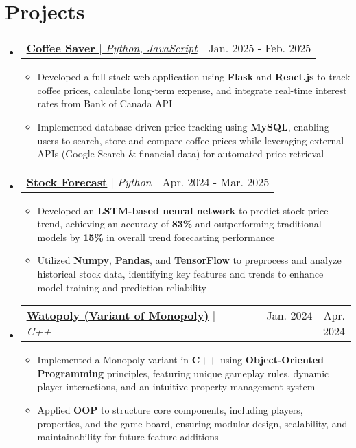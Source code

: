 \documentclass[letterpaper,11pt]{article}
\makeatletter
\newcommand{\resumeItem}[1]{
  \item\small{
    {#1 \vspace{-2pt}}
  }
}
\newcommand{\resumeProjectHeading}[2]{
    \item
    \begin{tabular*}{0.97\textwidth}{l@{\extracolsep{\fill}}r}
      \small#1 & #2 \\
    \end{tabular*}\vspace{-7pt}
}
\newcommand{\resumeSubHeadingListStart}{\begin{itemize}[leftmargin=0.15in, label={}]}
\newcommand{\resumeSubHeadingListEnd}{\end{itemize}}
\newcommand{\resumeItemListStart}{\begin{itemize}}
\newcommand{\resumeItemListEnd}{\end{itemize}\vspace{-5pt}}
\makeatother
\begin{document}
\section{Projects}
  \resumeSubHeadingListStart
    \resumeProjectHeading
      {\href{https://github.com/ThomasLiuuu/Projects/tree/main/Save\%20Money}{\underline{\textbf{Coffee Saver}} $|$ \emph{Python, JavaScript}}}{Jan. 2025 - Feb. 2025}
      \resumeItemListStart
        \resumeItem{Developed a full-stack web application using \textbf{Flask} and \textbf{React.js} to track coffee prices, calculate long-term expense, and integrate real-time interest rates from Bank of Canada API}
        \resumeItem{Implemented database-driven price tracking using \textbf{MySQL}, enabling users to search, store and compare coffee prices while leveraging external APIs (Google Search \& financial data) for automated price retrieval}
      \resumeItemListEnd

    \resumeProjectHeading
      {\href{https://github.com/ThomasLiuuu/Projects/tree/main/Stock\%20Forcast}{\underline{\textbf{Stock Forecast}}} $|$ \emph{Python}}{Apr. 2024 - Mar. 2025}
      \resumeItemListStart
        \resumeItem{Developed an \textbf{LSTM-based neural network} to predict stock price trend, achieving an accuracy of \textbf{83\%} and outperforming traditional models by \textbf{15\%} in overall trend forecasting performance}
        \resumeItem{Utilized \textbf{Numpy}, \textbf{Pandas}, and \textbf{TensorFlow} to preprocess and analyze historical stock data, identifying key features and trends to enhance model training and prediction reliability}
      \resumeItemListEnd

    \resumeProjectHeading
      {\href{https://github.com/ThomasLiuuu/Projects/tree/main/Watopoly}{\underline{\textbf{Watopoly (Variant of Monopoly)}}} $|$ \emph{C++}}{Jan. 2024 - Apr. 2024}
      \resumeItemListStart
        \resumeItem{Implemented a Monopoly variant in \textbf{C++} using \textbf{Object-Oriented Programming} principles, featuring unique gameplay rules, dynamic player interactions, and an intuitive property management system}
        \resumeItem{Applied \textbf{OOP} to structure core components, including players, properties, and the game board, ensuring modular design, scalability, and maintainability for future feature additions}
      \resumeItemListEnd

  \resumeSubHeadingListEnd
\end{document}
